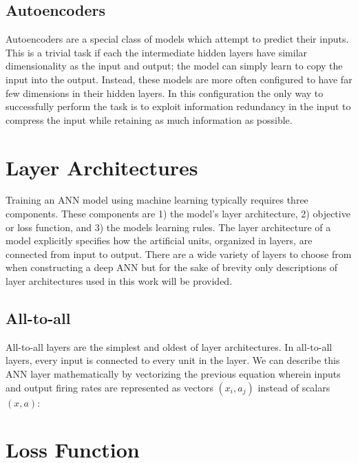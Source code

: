 \documentclass{templates/ucdenverthesis}
\begin{document}
\hypertarget{sec:autoencoders}{%
\subsection{Autoencoders}\label{sec:autoencoders}}

Autoencoders are a special class of models which attempt to predict their inputs. This is a trivial task if each the intermediate hidden layers have similar dimensionality as the input and output; the model can simply learn to copy the input into the output. Instead, these models are more often configured to have far few dimensions in their hidden layers. In this configuration the only way to successfully perform the task is to exploit information redundancy in the input to compress the input while retaining as much information as possible.

\hypertarget{sec:architectures}{%
\section{Layer Architectures}\label{sec:architectures}}

Training an ANN model using machine learning typically requires three components. These components are 1) the model's layer architecture, 2) objective or loss function, and 3) the models learning rules. The layer architecture of a model explicitly specifies how the artificial units, organized in layers, are connected from input to output. There are a wide variety of layers to choose from when constructing a deep ANN but for the sake of brevity only descriptions of layer architectures used in this work will be provided.

\hypertarget{sec:all2all}{%
\subsection{All-to-all}\label{sec:all2all}}

All-to-all layers are the simplest and oldest of layer architectures. In all-to-all layers, every input is connected to every unit in the layer. We can describe this ANN layer mathematically by vectorizing the previous equation wherein inputs and output firing rates are represented as vectors \((x_i,a_j)\) instead of scalars \((x,a)\):

\hypertarget{sec:lossfunc}{%
\section{Loss Function}\label{sec:lossfunc}}
\end{document}
